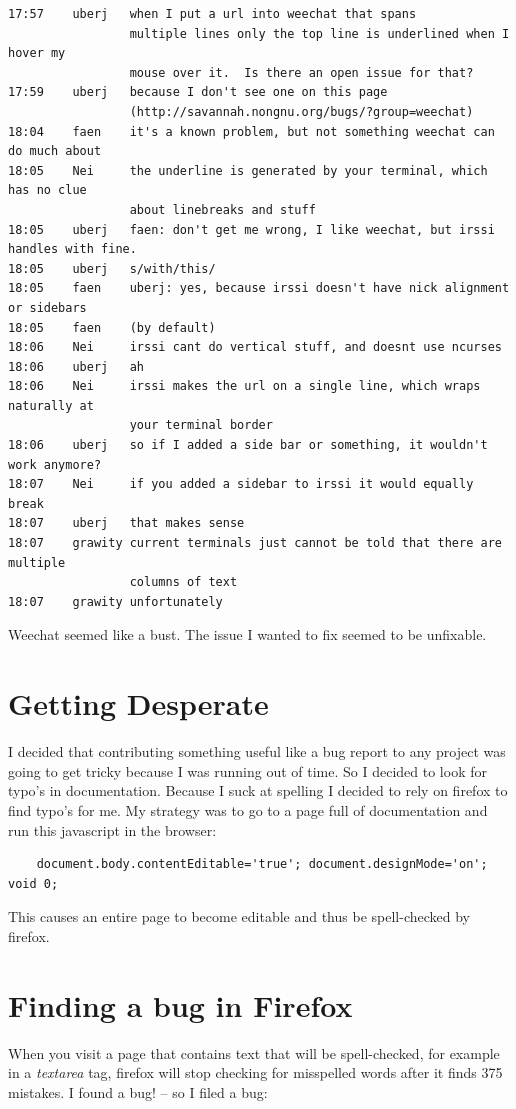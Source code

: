 \documentclass[12pt]{article}
\begin{document}
\begin{lstlisting}
17:57    uberj   when I put a url into weechat that spans
                 multiple lines only the top line is underlined when I hover my
                 mouse over it.  Is there an open issue for that?
17:59    uberj   because I don't see one on this page
                 (http://savannah.nongnu.org/bugs/?group=weechat)
18:04    faen    it's a known problem, but not something weechat can do much about
18:05    Nei     the underline is generated by your terminal, which has no clue
                 about linebreaks and stuff
18:05    uberj   faen: don't get me wrong, I like weechat, but irssi handles with fine.
18:05    uberj   s/with/this/
18:05    faen    uberj: yes, because irssi doesn't have nick alignment or sidebars
18:05    faen    (by default)
18:06    Nei     irssi cant do vertical stuff, and doesnt use ncurses
18:06    uberj   ah
18:06    Nei     irssi makes the url on a single line, which wraps naturally at
                 your terminal border
18:06    uberj   so if I added a side bar or something, it wouldn't work anymore?
18:07    Nei     if you added a sidebar to irssi it would equally break
18:07    uberj   that makes sense
18:07    grawity current terminals just cannot be told that there are multiple
                 columns of text
18:07    grawity unfortunately
\end{lstlisting}

Weechat seemed like a bust. The issue I wanted to fix seemed to be unfixable.


\section{Getting Desperate}

I decided that contributing something useful like a bug report to any project was going to get
tricky because I was running out of time. So I decided to look for typo's in documentation. Because I
suck at spelling I decided to rely on firefox to find typo's for me. My strategy was to go to a page
full of documentation and run this javascript in the browser:


\begin{lstlisting}
    document.body.contentEditable='true'; document.designMode='on'; void 0;
\end{lstlisting}

This causes an entire page to become editable and thus be spell-checked by firefox.

\section{Finding a bug in Firefox}
When you visit a page that contains text that will be spell-checked, for example in a \emph{textarea}
tag, firefox will stop checking for misspelled words after it finds 375 mistakes. I found a bug! --
so I filed a bug:
\end{document}
